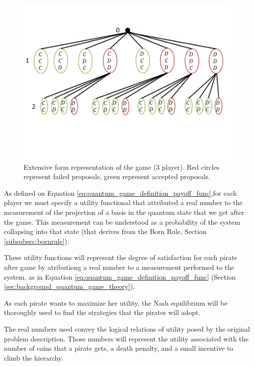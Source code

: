 \begin{figure}[h]
\centering 
\includegraphics[scale=0.55]{Figures/architecture/GameTree/Slide1.png}
\caption{Extensive form representation of the game ($3$ player). Red circles represent failed proposals, green represent accepted proposals. }
\label{fig:pg_architecturegametree}
\end{figure}

As defined on Equation \ref{eq:quantum_game_definition_payoff_func},for each player we must specify a utility functional that attributed a real number to the measurement of the projection of a basis in the quantum state that we get after the game. This measurement can be understood as a probability of the system collapsing into that state (that derives from the Born Rule, Section \ref{subsubsec:bornrule}).


These utility functions will represent the degree of satisfaction for each pirate after game by atributiong a real number to a measurement performed to the system, as in Equation \ref{eq:quantum_game_definition_payoff_func} (Section \ref{sec:background_quantum_game_theory}). 

As each pirate wants to maximize her utility, the Nash equilibrium will be thoroughly used to find the strategies that the pirates will adopt\cite{nash50}\cite{Nash51}.

The real numbers used convey the logical relations of utility posed by the original problem description. Those numbers will represent the utility associated with the number of coins that a pirate gets, a death penalty, and a small incentive to climb the hierarchy.

